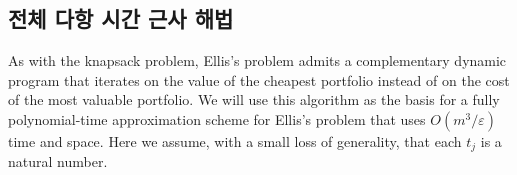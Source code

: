 \documentclass[12pt]{article} %
\newcommand{\lIfElse}[3]{\lIf{#1}{#2 \textbf{else}~#3}}
\newif\ifen
\newtheorem{theorem}{Theorem}
\theoremstyle{definition}
\newtheorem{theorem}{정리}
\theoremstyle{definition}
\begin{document}
%
%


\ifen \subsection{Fully polynomial-time approximation scheme}\else \subsection{전체 다항 시간 근사 해법}\fi
As with the knapsack problem, Ellis's problem admits a complementary dynamic program that iterates on the value of the cheapest portfolio instead of on the cost of the most valuable portfolio. We will use this algorithm as the basis for a fully polynomial-time approximation scheme for Ellis's problem that uses $O(m^3 / \varepsilon)$ time and space. Here we assume, with a small loss of generality, that each $t_j$ is a natural number.
\end{document}

